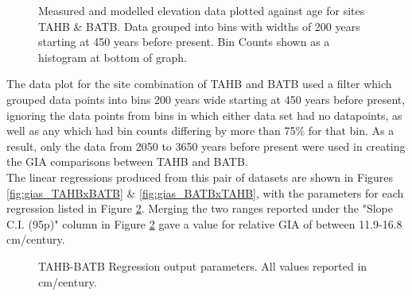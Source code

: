 \begin{figure}[H]
	\caption{Measured and modelled elevation data plotted against age for sites TAHB \& BATB. Data grouped into bins with widths of 200 years starting at 450 years before present. Bin Counts shown as a histogram at bottom of graph.}	
	\label{fig:data_TAHBxBATB}
\end{figure}

The data plot for the site combination of TAHB and BATB used a filter which 
grouped data points into bins 200 years wide starting at 450 years before present,
ignoring the data points from bins in which either data set had no datapoints,
as well as any which had bin counts differing by more than 75\% for that bin.
As a result, only the data from 2050 to 3650 years before present were used in
creating the GIA comparisons between TAHB and BATB.\\
The linear regressions produced from this pair of datasets are shown in Figures 
\ref{fig:gias_TAHBxBATB} \& \ref{fig:gias_BATBxTAHB}, with the parameters for each
regression listed in Figure \ref{fig:TAHBxBATB_regression}. Merging the two ranges
reported under the "Slope C.I. (95p)" column in Figure \ref{fig:TAHBxBATB_regression} gave
a value for relative GIA of between 11.9-16.8 cm/century. \\


\begin{figure}[H]
	\begin{flushleft}
	\end{flushleft}
	\caption{TAHB-BATB Regression output parameters. All values reported in cm/century.}
	\label{fig:TAHBxBATB_regression}
\end{figure}


